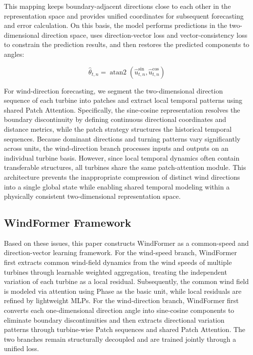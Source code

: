 This mapping keeps boundary-adjacent directions close to each other in the representation space and provides unified coordinates for subsequent forecasting and error calculation. On this basis, the model performs predictions in the two-dimensional direction space, uses direction-vector loss and vector-consistency loss to constrain the prediction results, and then restores the predicted components to angles:

\begin{equation}
\hat{\theta}_{t,n} = \operatorname{atan2} \left( \hat{u}^{\sin}_{t,n}, \hat{u}^{\cos}_{t,n} \right)
\end{equation}

For wind-direction forecasting, we segment the two-dimensional direction sequence of each turbine into patches and extract local temporal patterns using shared Patch Attention. Specifically, the sine-cosine representation resolves the boundary discontinuity by defining continuous directional coordinates and distance metrics, while the patch strategy structures the historical temporal sequences. Because dominant directions and turning patterns vary significantly across units, the wind-direction branch processes inputs and outputs on an individual turbine basis. However, since local temporal dynamics often contain transferable structures, all turbines share the same patch-attention module. This architecture prevents the inappropriate compression of distinct wind directions into a single global state while enabling shared temporal modeling within a physically consistent two-dimensional representation space.

\subsection{WindFormer Framework}

Based on these issues, this paper constructs WindFormer as a common-speed and direction-vector learning framework. For the wind-speed branch, WindFormer first extracts common wind-field dynamics from the wind speeds of multiple turbines through learnable weighted aggregation, treating the independent variation of each turbine as a local residual. Subsequently, the common wind field is modeled via attention using Phase as the basic unit, while local residuals are refined by lightweight MLPs. For the wind-direction branch, WindFormer first converts each one-dimensional direction angle into sine-cosine components to eliminate boundary discontinuities and then extracts directional variation patterns through turbine-wise Patch sequences and shared Patch Attention. The two branches remain structurally decoupled and are trained jointly through a unified loss.

